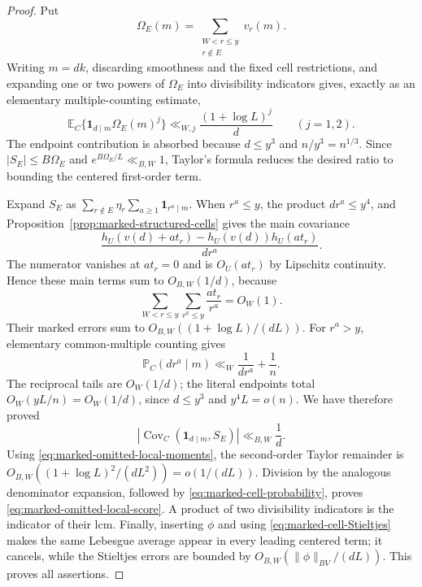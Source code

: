\documentclass[11pt]{article}
\numberwithin{equation}{section}
\theoremstyle{definition}
\theoremstyle{remark}
\newcommand{\1}{\mathbf 1}
\begin{document}
\begin{proof}
Put
\[
 \Omega_E(m)=\sum_{\substack{W<r\leq y\\r\notin E}}v_r(m).
\]
Writing \(m=dk\), discarding smoothness and the fixed cell restrictions,
and expanding one or two powers of \(\Omega_E\) into divisibility
indicators gives, exactly as an elementary multiple-counting estimate,
\begin{equation}
 \mathbb E_C\{\1_{d\mid m}\Omega_E(m)^j\}
 \ll_{W,j}\frac{(1+\log L)^j}{d}\qquad(j=1,2).
 \label{eq:marked-omitted-local-moments}
\end{equation}
The endpoint contribution is absorbed because \(d\leq y^3\) and
\(n/y^3=n^{1/3}\).  Since \(|S_E|\leq B\Omega_E\) and
\(e^{B\Omega_E/L}\ll_{B,W}1\), Taylor's formula reduces the desired
ratio to bounding the centered first-order term.

Expand \(S_E\) as
\(\sum_{r\notin E}\eta_r\sum_{a\geq1}\1_{r^a\mid m}\).  When
\(r^a\leq y\), the product \(dr^a\leq y^4\), and
Proposition~\ref{prop:marked-structured-cells} gives the main covariance
\[
 \frac{h_U(v(d)+at_r)-h_U(v(d))h_U(at_r)}{dr^a}.
\]
The numerator vanishes at \(at_r=0\) and is
\(O_U(at_r)\) by Lipschitz continuity.  Hence these main terms sum to
\(O_{B,W}(1/d)\), because
\[
 \sum_{W<r\leq y}\sum_{r^a\leq y}\frac{at_r}{r^a}=O_W(1).
\]
Their marked errors sum to
\(O_{B,W}((1+\log L)/(dL))\).  For \(r^a>y\), elementary common-multiple
counting gives
\[
 \mathbb P_C(dr^a\mid m)\ll_W\frac1{dr^a}+\frac1n.
\]
The reciprocal tails are \(O_W(1/d)\); the literal endpoints total
\(O_W(yL/n)=O_W(1/d)\), since \(d\leq y^3\) and
\(y^4L=o(n)\).  We have therefore proved
\begin{equation}
 |\operatorname{Cov}_C(\1_{d\mid m},S_E)|\ll_{B,W}\frac1d.
 \label{eq:marked-omitted-local-first-order}
\end{equation}
Using \eqref{eq:marked-omitted-local-moments}, the second-order Taylor
remainder is
\(O_{B,W}((1+\log L)^2/(dL^2))=o(1/(dL))\).  Division by the analogous
denominator expansion, followed by
\eqref{eq:marked-cell-probability}, proves
\eqref{eq:marked-omitted-local-score}.  A product of two divisibility
indicators is the indicator of their lcm.  Finally, inserting \(\phi\)
and using \eqref{eq:marked-cell-Stieltjes} makes the same Lebesgue
average appear in every leading centered term; it cancels, while the
Stieltjes errors are bounded by
\(O_{B,W}(\|\phi\|_{BV}/(dL))\).  This proves all assertions.
\end{proof}
\end{document}

